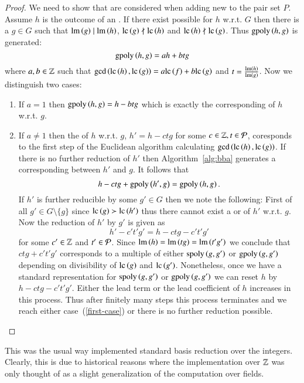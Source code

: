 \begin{proof}
We need to show that \lcrs are considered when adding new \gpts to the pair set
$P$. Assume $h$ is the outcome of an \ltr. If there exist possible \lcrs for $h$
w.r.t. $G$ then there is a $g \in G$ such that $\operatorname{lm}\left({g}\right) \mid \operatorname{lm}\left({h}\right)$, $\mathrm{lc}\left({g}\right)
\nmid \mathrm{lc}\left({h}\right)$ and $\mathrm{lc}\left({h}\right) \nmid \mathrm{lc}\left({g}\right)$. Thus $\mathrm{gpoly}\left({h},{g}\right)$ is generated:
\[\mathrm{gpoly}\left({h},{g}\right) = a h + b t g\]
where $a, b \in \mathbb{Z}$ such that $\gcd\left(\mathrm{lc}\left({h}\right), \mathrm{lc}\left({g}\right)\right) = a \mathrm{lc}\left({f}\right) + b \mathrm{lc}\left({g}\right)$ and $t = \frac{\operatorname{lm}\left({h}\right)}{\operatorname{lm}\left({g}\right)}$. Now we distinguish two cases:
\begin{enumerate}
\item\label{first-case} If $a=1$ then $\mathrm{gpoly}\left({h},{g}\right) = h - b t g$ which is exactly the corresponding
\lcr of $h$ w.r.t. $g$.
\item If $a \neq 1$ then the \lcr of $h$ w.r.t. $g$, $h' = h - ctg$ for some
$c\in \mathbb{Z}, t\in\mathcal{P}$, coresponds to the first step
of the Euclidean algorithm calculating $\gcd\left(\mathrm{lc}\left({h}\right), \mathrm{lc}\left({g}\right)\right)$. If there
is no further reduction of $h'$ then Algorithm~\ref{alg:bba} generates a corresponding
\gpt between $h'$ and $g$. It follows that
\[h - ctg + \mathrm{gpoly}\left({h'},{g}\right) = \mathrm{gpoly}\left({h},{g}\right).\]
If $h'$ is further reducible by some $g' \in G$ then we note the following:
First of all $g' \in G\setminus \{g\}$ since $\mathrm{lc}\left({g}\right) \succ \mathrm{lc}\left({h'}\right)$ thus there
cannot exist a \ltr or \lcr of $h'$ w.r.t. $g$. Now the reduction of $h'$ by
$g'$ is given as
\[h' - c't'g' = h - ctg - c't'g'\]
for some $c' \in \mathbb{Z}$ and $t' \in \mathcal{P}$. Since $\operatorname{lm}\left({h}\right) = \operatorname{lm}\left({tg}\right) = \operatorname{lm}\left({t'g'}\right)$ we
conclude that $ctg + c't'g'$ corresponds to a multiple of either $\mathrm{spoly}\left({g},{g'}\right)$ or $\mathrm{gpoly}\left({g},{g'}\right)$ depending on divisibility of $\mathrm{lc}\left({g}\right)$ and $\mathrm{lc}\left({g'}\right)$.
Nonetheless, once we have a standard representation for $\mathrm{spoly}\left({g},{g'}\right)$ or
$\mathrm{gpoly}\left({g},{g'}\right)$ we can reset $h$ by $h - ctg - c't'g'$. Either the lead term or
the lead coefficient of $h$ increases in this process. Thus after finitely many
steps this process terminates and we reach either case~(\ref{first-case}) or
there is no further \lcr reduction possible.
\end{enumerate}
\end{proof}

This was the usual way \singular implemented standard basis reduction over the
integers. Clearly, this is due to historical reasons where the implementation
over $\mathbb{Z}$ was only thought of as a slight generalization of the computation
over fields.

